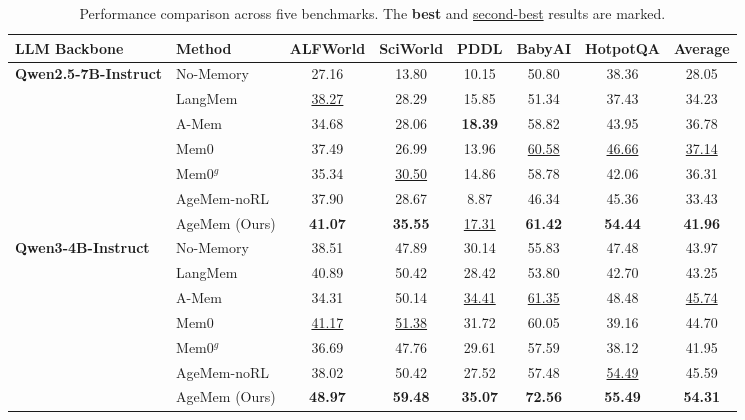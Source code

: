 \begin{table}[t]
\centering
\small
\caption{Performance comparison across five benchmarks. The \textbf{best} and \underline{second-best} results are marked.}
\label{tab:main_results}
\setlength{\tabcolsep}{6pt}
\begin{tabular}{@{}l|l|@{\hspace{6pt}}ccccc@{\hspace{6pt}}|c@{}}
\toprule
\textbf{LLM Backbone} & \textbf{Method} & \textbf{ALFWorld} & \textbf{SciWorld} & \textbf{PDDL} & \textbf{BabyAI} & \textbf{HotpotQA} & \textbf{Average} \\
\midrule
\multirow{7}{*}{\textbf{Qwen2.5-7B-Instruct}} 
& No-Memory & 27.16 & 13.80 & 10.15 & 50.80 & 38.36 & 28.05 \\
& LangMem & \underline{38.27} & 28.29 & 15.85 & 51.34 & 37.43 & 34.23 \\
& A-Mem & 34.68 & 28.06 & \textbf{18.39} & 58.82 & 43.95 & 36.78 \\
& Mem0 & 37.49 & 26.99 & 13.96 & \underline{60.58} & \underline{46.66} & \underline{37.14} \\
& Mem0$^{g}$ & 35.34 & \underline{30.50} & 14.86 & 58.78 & 42.06 & 36.31 \\
& \cellcolor{gray!15}AgeMem-noRL & \cellcolor{gray!15}37.90 & \cellcolor{gray!15}28.67 & \cellcolor{gray!15}8.87 & \cellcolor{gray!15}46.34 & \cellcolor{gray!15}45.36 & \cellcolor{gray!15}33.43 \\
& \cellcolor{gray!15}AgeMem (Ours) & \cellcolor{gray!15}\textbf{41.07} & \cellcolor{gray!15}\textbf{35.55} & \cellcolor{gray!15}\underline{17.31} & \cellcolor{gray!15}\textbf{61.42} & \cellcolor{gray!15}\textbf{54.44} & \cellcolor{gray!15}\textbf{41.96} \\
\midrule
\multirow{7}{*}{\textbf{Qwen3-4B-Instruct}} 
& No-Memory & 38.51 & 47.89 & 30.14 & 55.83 & 47.48 & 43.97 \\
& LangMem & 40.89 & 50.42 & 28.42 & 53.80 & 42.70 & 43.25 \\
& A-Mem & 34.31 & 50.14 & \underline{34.41} & \underline{61.35} & 48.48 & \underline{45.74} \\
& Mem0 & \underline{41.17} & \underline{51.38} & 31.72 & 60.05 & 39.16 & 44.70\\
& Mem0$^{g}$ & 36.69 & 47.76 & 29.61 & 57.59 & 38.12 & 41.95 \\
& \cellcolor{gray!15}AgeMem-noRL & \cellcolor{gray!15}38.02 & \cellcolor{gray!15}50.42 & \cellcolor{gray!15}27.52 & \cellcolor{gray!15}57.48 & \cellcolor{gray!15}\underline{54.49} & \cellcolor{gray!15}45.59 \\
& \cellcolor{gray!15}AgeMem (Ours) & \cellcolor{gray!15}\textbf{48.97} & \cellcolor{gray!15}\textbf{59.48} & \cellcolor{gray!15}\textbf{35.07} & \cellcolor{gray!15}\textbf{72.56} & \cellcolor{gray!15}\textbf{55.49} & \cellcolor{gray!15}\textbf{54.31} \\
\bottomrule
\end{tabular}
\vspace{-0.3cm}
\end{table}

